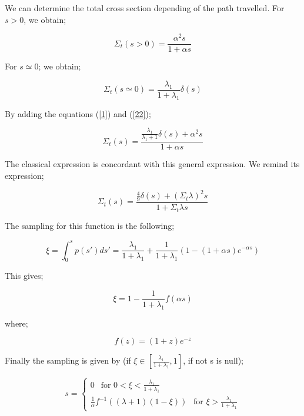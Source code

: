 \documentclass[a4paper, 12pt]{report}
\begin{document}
We can determine the total cross section depending of the path travelled.
For $s>0$, we obtain;

\begin{equation}\label{1}
\Sigma_t(s>0) = \frac{\alpha^2s}{1+\alpha s}
\end{equation}

For $s \simeq 0$; we obtain;

\begin{equation}\label{22}
\Sigma_t(s\simeq 0) = \frac{\lambda_1}{1+\lambda_1}\delta(s)
\end{equation}

By adding the equations (\ref{1}) and (\ref{22});

\begin{equation}
\Sigma_t(s) = \frac{\frac{\lambda_1}{\lambda_1 + 1}\delta(s) + \alpha^2 s}{1+\alpha s}
\end{equation}

The classical expression is concordant with this general expression. We remind its expression;

\begin{equation}
\Sigma_t(s) = \frac{\frac{4}{9}\delta(s)+ (\Sigma_t \lambda)^2s}{1+\Sigma_t \lambda s}
\end{equation}

The sampling for this function is the following;

\begin{equation}
\xi = \int_0^s p(s')ds' = \frac{\lambda_1}{1+\lambda_1} + \frac{1}{1+\lambda_1}\left(1-(1+\alpha s)e^{-\alpha s}\right)
\end{equation}

This gives;

\begin{equation}
\xi = 1 - \frac{1}{1+\lambda_1}f(\alpha s)
\end{equation}

where;

\begin{equation}
f(z) = (1+z)e^{-z}
\end{equation}

Finally the sampling is given by (if $\xi \in [\frac{\lambda_1}{1+\lambda_1},1]$, if not s is null);

\begin{center}
\begin{equation}
s = \begin{cases}
0  \ \ \text{ for } 0 < \xi < \frac{\lambda_1}{1+\lambda_1} \\ 
\frac{1}{\alpha}f^{-1}((\lambda+1)(1-\xi)) \ \ \text{ for }  \xi > \frac{\lambda_1}{1+\lambda_1} 
\end{cases}
\end{equation}
\end{center}
\end{document}
